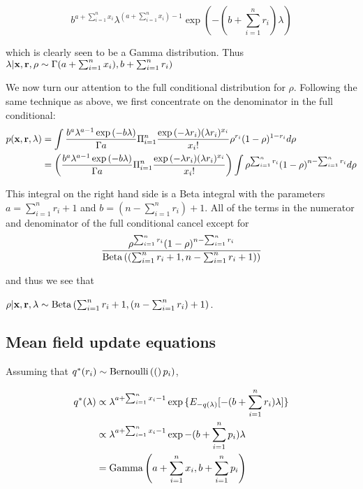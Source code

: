 \documentclass{amsart}
\begin{document}
$$
b^{a+\sum_{i=1}^n x_i} \lambda^{(a + \sum_{i=1}^n x_i) - 1} \exp{(-(b + \sum_{i=1}^n r_i) \lambda)}
$$

which is clearly seen to be a Gamma distribution. Thus
$\lambda | \textbf{x}, \textbf{r}, \rho \sim \Gamma{(a + \sum_{i=1}^n x_i), b + \sum_{i=1}^n r_i)}$

We now turn our attention to the full conditional distribution for $\rho$. Following the same
technique as above, we first concentrate on the denominator in the full conditional:
\begin{align*}
p(\textbf{x}, \textbf{r}, \lambda) &= \int \frac{b^a \lambda^{a - 1} \exp{(-b \lambda)}}{\Gamma{a}} \Pi_{i=1}^n \frac{\exp{(-\lambda r_i)} (\lambda r_i)^{x_i}}{x_i !} \rho^{r_i} (1 - \rho)^{1 - r_i} d \rho \\
&= \left(\frac{b^a \lambda^{a - 1} \exp{(-b \lambda)}}{\Gamma{a}} \Pi_{i=1}^n \frac{\exp{(-\lambda r_i)} (\lambda r_i)^{x_i}}{x_i !} \right) \int \rho^{\sum_{i=1}^n r_i} (1 - \rho)^{n - \sum_{i=1}^n r_i} d \rho
\end{align*}

This integral on the right hand side is a Beta integral with the parameters
$a = \sum_{i=1}^n r_i + 1$ and $b = (n - \sum_{i=1}^n r_i) + 1$. All of the terms in the numerator and 
denominator of the full conditional cancel except for
$$
\frac{\rho^{\sum_{i=1}^n r_i} (1 - \rho)^{n - \sum_{i=1}^n r_i}}{\text{Beta} \left( (\sum_{i=1}^n r_i + 1, n - \sum_{i=1}^n r_i + 1) \right)}
$$

and thus we see that

$\rho | \textbf{x}, \textbf{r}, \lambda \sim \text{Beta} \left( \sum_{i=1}^n r_i + 1, (n - \sum_{i=1}^n r_i) + 1 \right)$.


\subsection{Mean field update equations}
Assuming that $q^*(r_i) \sim \text{Bernoulli} \left( ( \right)p_i)$,

\begin{align*}
q^*(\lambda) &\propto \lambda^{a+\sum_{i=1}^n x_i - 1} \exp{\{ E_{-q(\lambda)} [-(b + \sum_{i=1}^n r_i) \lambda] \}} \\
&\propto \lambda^{a+\sum_{i=1}^n x_i - 1} \exp{-(b + \sum_{i=1}^n p_i)\lambda} \\
&= \text{Gamma} \left( a+\sum_{i=1}^n x_i, b + \sum_{i=1}^n p_i \right)
\end{align*}
\end{document}
